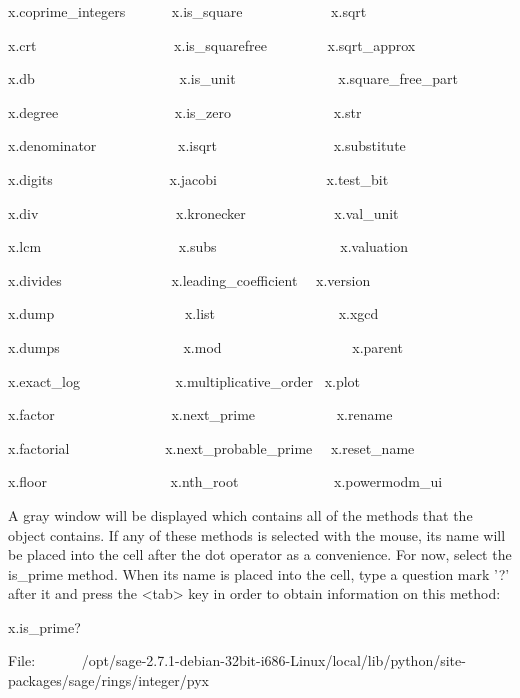 \documentclass[12pt,oneside]{book}
\begin{document}
x.coprime\_integers \ \ \ \ \ \ x.is\_square
\ \ \ \ \ \ \ \ \ \ \ \ x.sqrt

x.crt \ \ \ \ \ \ \ \ \ \ \ \ \ \ \ \ \ \ \ x.is\_squarefree
\ \ \ \ \ \ \ \ x.sqrt\_approx

x.db \ \ \ \ \ \ \ \ \ \ \ \ \ \ \ \ \ \ \ \ x.is\_unit
\ \ \ \ \ \ \ \ \ \ \ \ \ \ x.square\_free\_part

x.degree \ \ \ \ \ \ \ \ \ \ \ \ \ \ \ \ x.is\_zero
\ \ \ \ \ \ \ \ \ \ \ \ \ \ x.str

x.denominator \ \ \ \ \ \ \ \ \ \ \ x.isqrt
\ \ \ \ \ \ \ \ \ \ \ \ \ \ \ \ x.substitute

x.digits \ \ \ \ \ \ \ \ \ \ \ \ \ \ \ \ x.jacobi
\ \ \ \ \ \ \ \ \ \ \ \ \ \ \ x.test\_bit

x.div \ \ \ \ \ \ \ \ \ \ \ \ \ \ \ \ \ \ \ x.kronecker
\ \ \ \ \ \ \ \ \ \ \ \ x.val\_unit

x.lcm \ \ \ \ \ \ \ \ \ \ \ \ \ \ \ \ \ \ \ x.subs
\ \ \ \ \ \ \ \ \ \ \ \ \ \ \ \ \ x.valuation

x.divides \ \ \ \ \ \ \ \ \ \ \ \ \ \ \ x.leading\_coefficient
\ \ x.version

x.dump \ \ \ \ \ \ \ \ \ \ \ \ \ \ \ \ \ \ x.list
\ \ \ \ \ \ \ \ \ \ \ \ \ \ \ \ \ x.xgcd

x.dumps \ \ \ \ \ \ \ \ \ \ \ \ \ \ \ \ \ x.mod
\ \ \ \ \ \ \ \ \ \ \ \ \ \ \ \ \ \ x.parent

x.exact\_log \ \ \ \ \ \ \ \ \ \ \ \ \ x.multiplicative\_order \ x.plot

x.factor \ \ \ \ \ \ \ \ \ \ \ \ \ \ \ \ x.next\_prime
\ \ \ \ \ \ \ \ \ \ \ x.rename

x.factorial \ \ \ \ \ \ \ \ \ \ \ \ \ x.next\_probable\_prime
\ \ x.reset\_name

x.floor \ \ \ \ \ \ \ \ \ \ \ \ \ \ \ \ \ x.nth\_root
\ \ \ \ \ \ \ \ \ \ \ \ \ x.powermodm\_ui


A gray window will be displayed which contains all of the methods that the object contains. If any of these methods is selected with the mouse, its name will be placed into the cell after the dot operator as a convenience. For now, select the is\_prime method. When its name is placed into the cell, type a question mark '?' after it and press the {\textless}tab{\textgreater} key in order to obtain information on this method: 

x.is\_prime?

{\textbar}

File:
\ \ \ \ \ \ /opt/sage{}-2.7.1{}-debian{}-32bit{}-i686{}-Linux/local/lib/python/site{}-packages/sage/rings/integer/pyx
\end{document}
